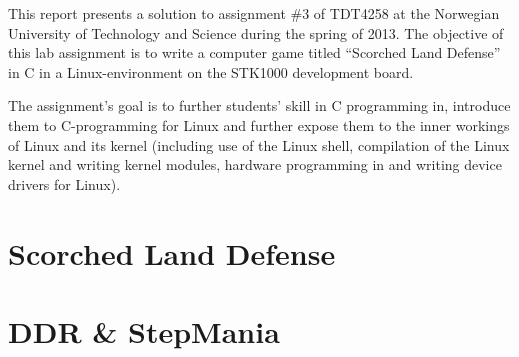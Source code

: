 This report presents a solution to assignment \#3 of TDT4258 at the Norwegian University of Technology and Science during the spring of 2013. The objective of this lab assignment is to write a computer game titled ``Scorched Land Defense'' in C in a Linux-environment on the STK1000 development board. 

The assignment's goal is to further students' skill in C programming in, introduce them to C-programming for Linux and further expose them to the inner workings of Linux and its kernel (including use of the Linux shell, compilation of the Linux kernel and writing kernel modules, hardware programming in and writing device drivers for Linux).

\section{Scorched Land Defense}
	

\section{DDR \& StepMania}
	
	